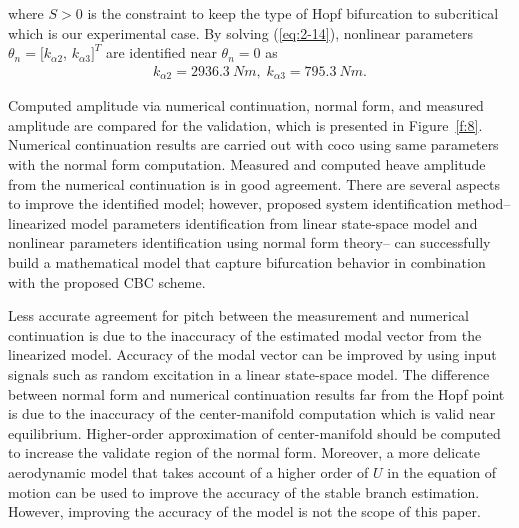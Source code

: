\documentclass[openacc]{rsproca_new}%
\newcommand{\Eref}[1]{(\ref{#1})}
\newcommand{\Fref}[1]{Figure~\ref{#1}}
\begin{document}
\noindent where $S>0$ is the constraint to keep the type of Hopf bifurcation to subcritical which is our experimental case. By solving \Eref{eq:2-14}, nonlinear parameters $\theta_n=[k_{\alpha2}$, $k_{\alpha3}]^T$ are identified near $\theta_n=0$ as
\begin{align}\label{eq:2-15}
k_{\alpha2}=2936.3 \: Nm, \; k_{\alpha3}=795.3 \: Nm.
\end{align}

Computed amplitude via numerical continuation, normal form, and measured amplitude are compared for the validation, which is presented in \Fref{f:8}. Numerical continuation results are carried out with coco \cite{dankowicz2013recipes} using same parameters with the normal form computation. Measured and computed heave amplitude from the numerical continuation is in good agreement. There are several aspects to improve the identified model; however, proposed system identification method-- linearized model parameters identification from linear state-space model and nonlinear parameters identification using normal form theory-- can successfully build a mathematical model that capture bifurcation behavior in combination with the proposed CBC scheme.

Less accurate agreement for pitch between the measurement and numerical continuation is due to the inaccuracy of the estimated modal vector from the linearized model. Accuracy of the modal vector can be improved by using input signals such as random excitation in a linear state-space model. The difference between normal form and numerical continuation results far from the Hopf point is due to the inaccuracy of the center-manifold computation which is valid near equilibrium. Higher-order approximation of center-manifold should be computed to increase the validate region of the normal form. Moreover, a more delicate aerodynamic model that takes account of a higher order of $U$ in the equation of motion can be used to improve the accuracy of the stable branch estimation. However, improving the accuracy of the model is not the scope of this paper.
\end{document}
